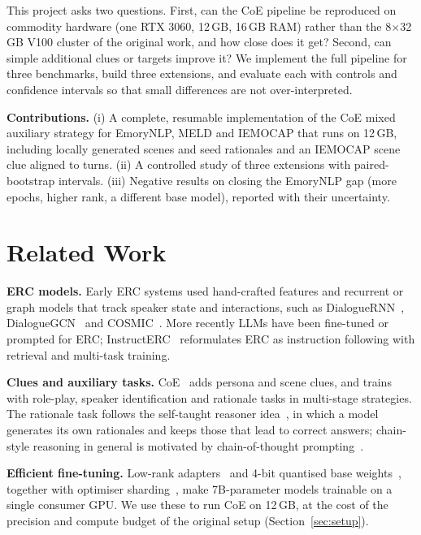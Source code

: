\documentclass[lettersize,journal]{IEEEtran}
\begin{document}
This project asks two questions. First, can the CoE pipeline be reproduced on commodity hardware (one RTX 3060, 12\,GB, 16\,GB RAM) rather than the 8$\times$32\,GB V100 cluster of the original work, and how close does it get? Second, can simple additional clues or targets improve it? We implement the full pipeline for three benchmarks, build three extensions, and evaluate each with controls and confidence intervals so that small differences are not over-interpreted.

\textbf{Contributions.}
(i) A complete, resumable implementation of the CoE mixed auxiliary strategy for EmoryNLP, MELD and IEMOCAP that runs on 12\,GB, including locally generated scenes and seed rationales and an IEMOCAP scene clue aligned to turns.
(ii) A controlled study of three extensions with paired-bootstrap intervals.
(iii) Negative results on closing the EmoryNLP gap (more epochs, higher rank, a different base model), reported with their uncertainty.

\section{Related Work}
\textbf{ERC models.} Early ERC systems used hand-crafted features and recurrent or graph models that track speaker state and interactions, such as DialogueRNN~\cite{dialoguernn2019}, DialogueGCN~\cite{dialoguegcn2019} and COSMIC~\cite{cosmic2020}. More recently LLMs have been fine-tuned or prompted for ERC; InstructERC~\cite{instructerc2023} reformulates ERC as instruction following with retrieval and multi-task training.

\textbf{Clues and auxiliary tasks.} CoE~\cite{coe2025} adds persona and scene clues, and trains with role-play, speaker identification and rationale tasks in multi-stage strategies. The rationale task follows the self-taught reasoner idea~\cite{star2022}, in which a model generates its own rationales and keeps those that lead to correct answers; chain-style reasoning in general is motivated by chain-of-thought prompting~\cite{cot2022}.

\textbf{Efficient fine-tuning.} Low-rank adapters~\cite{lora2022} and 4-bit quantised base weights~\cite{qlora2023}, together with optimiser sharding~\cite{zero2020}, make 7B-parameter models trainable on a single consumer GPU. We use these to run CoE on 12\,GB, at the cost of the precision and compute budget of the original setup (Section~\ref{sec:setup}).
\end{document}
